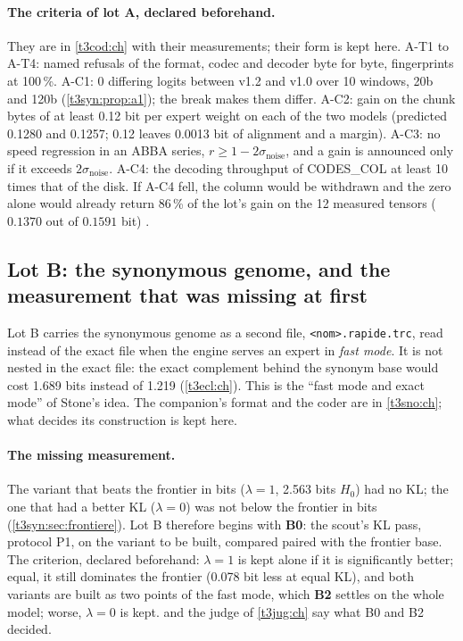 \paragraph{The criteria of lot A, declared beforehand.} They are in \cref{t3cod:ch} with their measurements; their form is kept here. A-T1 to A-T4: named refusals of the format, codec and decoder byte for byte, fingerprints at 100\,\%. A-C1: 0 differing logits between v1.2 and v1.0 over 10 windows, 20b and 120b (\cref{t3syn:prop:a1}); the break makes them differ. A-C2: gain on the chunk bytes of at least 0.12 bit per expert weight on each of the two models (predicted 0.1280 and 0.1257; 0.12 leaves 0.0013 bit of alignment and a margin). A-C3: no speed regression in an ABBA series, $r \ge 1 - 2\sigma_{\text{noise}}$, and a gain is announced only if it exceeds $2\sigma_{\text{noise}}$. A-C4: the decoding throughput of CODES\_COL at least 10 times that of the disk. If A-C4 fell, the column would be withdrawn and the zero alone would already return 86\,\% of the lot's gain on the 12 measured tensors ($0.1370$ out of $0.1591$ bit) \calc.

\subsection{Lot B: the synonymous genome, and the measurement that was missing at first}\label{t3syn:sec:lot-b}

Lot B carries the synonymous genome as a second file, \texttt{<nom>.rapide.trc}, read instead of the exact file when the engine serves an expert in \emph{fast mode}. It is not nested in the exact file: the exact complement behind the synonym base would cost 1.689 bits instead of 1.219 (\cref{t3ecl:ch}). This is the ``fast mode and exact mode'' of Stone's idea. The companion's format and the coder are in \cref{t3sno:ch}; what decides its construction is kept here.

\paragraph{The missing measurement.} The variant that beats the frontier in bits ($\lambda = 1$, 2.563 bits $H_0$) had no KL; the one that had a better KL ($\lambda = 0$) was not below the frontier in bits (\cref{t3syn:sec:frontiere}). Lot B therefore begins with \textbf{B0}: the scout's KL pass, protocol P1, on the variant to be built, compared paired with the frontier base. The criterion, declared beforehand: $\lambda = 1$ is kept alone if it is significantly better; equal, it still dominates the frontier (0.078 bit less at equal KL), and both variants are built as two points of the fast mode, which \textbf{B2} settles on the whole model; worse, $\lambda = 0$ is kept.  and the judge of \cref{t3jug:ch} say what B0 and B2 decided.

